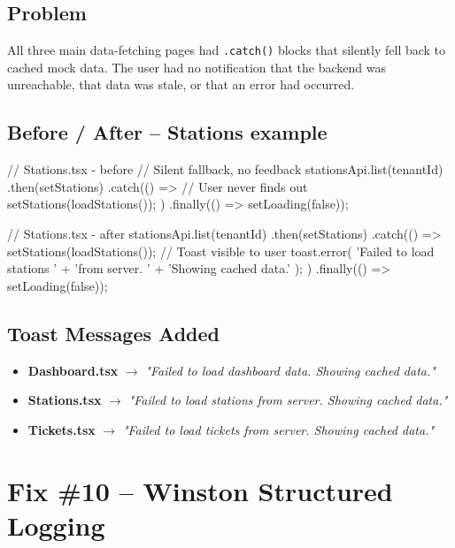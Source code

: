 \documentclass[12pt,a4paper]{report}
\newcommand{\diffL}{\noindent\begin{minipage}[t]{0.485\linewidth}}
\newcommand{\diffR}{\end{minipage}\hfill\begin{minipage}[t]{0.485\linewidth}}
\newcommand{\diffend}{\end{minipage}\par\smallskip}
\begin{document}
	\subsection*{Problem}
	
	All three main data-fetching pages had \texttt{.catch()} blocks that silently
	fell back to cached mock data. The user had no notification that the backend
	was unreachable, that data was stale, or that an error had occurred.
	
	\subsection*{Before / After -- Stations example}
	
	\diffL
	\begin{beforecode}
		// Stations.tsx - before
		// Silent fallback, no feedback
		stationsApi.list(tenantId)
		.then(setStations)
		.catch(() => {
			// User never finds out
			setStations(loadStations());
		})
		.finally(() => setLoading(false));
	\end{beforecode}
	\diffR
	\begin{aftercode}
		// Stations.tsx - after
		stationsApi.list(tenantId)
		.then(setStations)
		.catch(() => {
			setStations(loadStations());
			// Toast visible to user
			toast.error(
			'Failed to load stations '
			+ 'from server. '
			+ 'Showing cached data.'
			);
		})
		.finally(() => setLoading(false));
	\end{aftercode}
	\diffend
	
	\subsection*{Toast Messages Added}
	\begin{itemize}
		\item \textbf{Dashboard.tsx} $\to$ \textit{"Failed to load dashboard data. Showing cached data."}
		\item \textbf{Stations.tsx}  $\to$ \textit{"Failed to load stations from server. Showing cached data."}
		\item \textbf{Tickets.tsx}   $\to$ \textit{"Failed to load tickets from server. Showing cached data."}
	\end{itemize}
	
	\section{Fix \#10 -- Winston Structured Logging}
	
\end{document}
